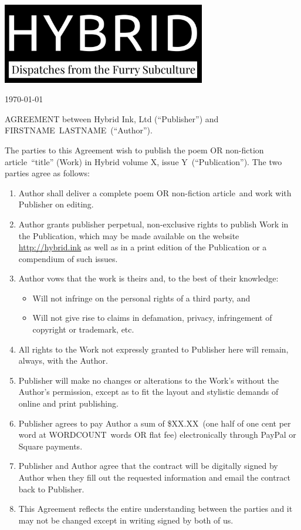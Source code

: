 \documentclass[12pt,letterpaper,oneside]{article}
\def\authorfirst{FIRSTNAME}
\def\authorlast{LASTNAME}
\def\worktitle{title}
\def\worktype{poem OR non-fiction article}
\def\workwords{WORDCOUNT}
\def\issue{volume X, issue Y}
\def\fee{\$XX.XX}
\def\rate{one half of one cent per word at \workwords\ words OR flat fee}
\begin{document}
  \noindent\includegraphics[width=3.5in]{logo}

  \vspace{.5in}

  \today

  \vspace{.5in}

  AGREEMENT between Hybrid Ink, Ltd (``Publisher'') and \authorfirst\ \authorlast\ (``Author'').

  The parties to this Agreement wish to publish the \worktype\ ``\worktitle'' (Work) in Hybrid \issue\ (``Publication''). The two parties agree as follows:

  \begin{enumerate}
    \item Author shall deliver a complete \worktype\ and work with Publisher on editing.
    \item Author grants publisher perpetual, non-exclusive rights to publish Work in the Publication, which may be made available on the website \url{http://hybrid.ink} as well as in a print edition of the Publication or a compendium of such issues.
    \item Author vows that the work is theirs and, to the best of their knowledge:
    \begin{itemize}
      \item Will not infringe on the personal rights of a third party, and
      \item Will not give rise to claims in defamation, privacy, infringement of copyright or trademark, etc.
    \end{itemize}
    \item All rights to the Work not expressly granted to Publisher here will remain, always, with the Author.
    \item Publisher will make no changes or alterations to the Work's without the Author’s permission, except as to fit the layout and stylistic demands of online and print publishing.
    \item Publisher agrees to pay Author a sum of \fee\ (\rate) electronically through PayPal or Square payments.
    \item Publisher and Author agree that the contract will be digitally signed by Author when they fill out the requested information and email the contract back to Publisher.
    \item This Agreement reflects the entire understanding between the parties and it may not be changed except in writing signed by both of us.
  \end{enumerate}
\end{document}
